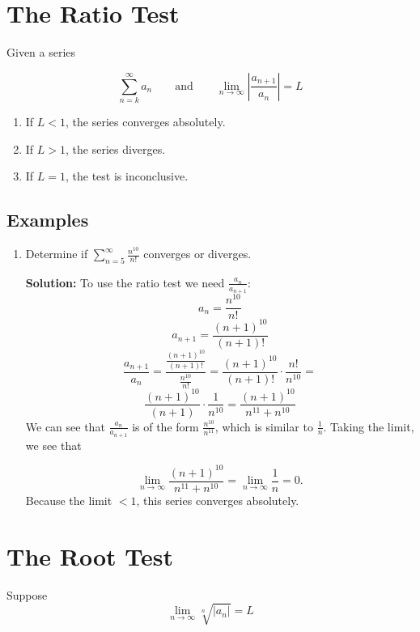 \documentclass[12pt]{report}
\begin{document}
\clearpage




\section{The Ratio Test}
Given a series
	
	$$ \sum_{n=k}^{\infty} a_n \quad \quad \text{and} \quad \quad \lim_{n\to\infty} \left| \frac{a_{n+1}}{a_n} \right| = L$$

\begin{enumerate}
	\item If $ L < 1 $, the series converges absolutely.
	\item If $ L > 1 $, the series diverges.
	\item If $ L = 1 $, the test is inconclusive.
\end{enumerate}

\subsection*{Examples}
\begin{enumerate}
	\item Determine if $ \sum_{n=5}^{\infty} \frac{n^{10}}{n!} $ converges or diverges.
	
	\textbf{Solution:} To use the ratio test we need $ \frac{a_n}{a_{n+1}} $:
	$$ a_n = \frac{n^{10}}{n!} $$
	$$ a_{n+1} = \frac{(n+1)^{10}}{(n+1)!} $$
	$$
		\frac{a_{n+1}}{a_n} = 
		\frac{\frac{(n+1)^{10}}{(n+1)!}}{\frac{n^{10}}{n!}} =
		\frac{(n+1)^{10}}{(n+1)!} \cdot \frac{n!}{n^{10}} =
	$$
	$$
		\frac{(n+1)^{10}}{(n+1)} \cdot \frac{1}{n^{10}} = 
		\frac{(n+1)^{10}}{n^{11}+n^{10}}
	$$
	We can see that $ \frac{a_n}{a_{n+1}} $ is of the form $ \frac{n^{10}}{n^{11}} $, which is similar to $ \frac{1}{n} $. Taking the limit, we see that
	
	$$
		\lim_{n\to\infty} \frac{(n+1)^{10}}{n^{11}+n^{10}} =
		\lim_{n\to\infty} \frac{1}{n} = 0.
	$$
	Because the limit $ < 1 $, this series converges absolutely. 
	
\end{enumerate}


\clearpage






\section{The Root Test}
Suppose
	$$ \lim_{n\to\infty} \sqrt[n]{|a_n|} = L $$
\end{document}
